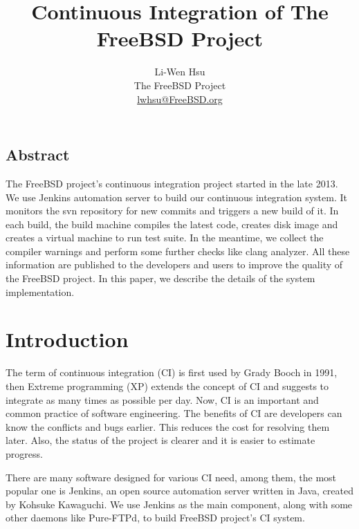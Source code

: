 \documentclass[a4paper,twocolumn,10pt]{article}
\begin{document}
\date{}

\title{\Large \bf Continuous Integration of The FreeBSD Project}

\author{
{\rm Li-Wen Hsu}\\
{\rm The FreeBSD Project}\\
{\rm \href{mailto:lwhsu@FreeBSD.org}{lwhsu@FreeBSD.org}}
}

\maketitle

\thispagestyle{empty}

\subsection*{Abstract}
The FreeBSD project's continuous integration project started in the late 2013.
We use Jenkins automation server to build our continuous integration system.
It monitors the svn repository for new commits and triggers a new build of it.
In each build, the build machine compiles the latest code, creates disk image
and creates a virtual machine to run test suite. In the meantime, we collect
the compiler warnings and perform some further checks like clang analyzer. All
these information are published to the developers and users to improve the
quality of the FreeBSD project. In this paper, we describe the details of the
system implementation.

\section{Introduction}

The term of continuous integration (CI) is first used by Grady Booch in 1991,
then Extreme programming (XP) extends the concept of CI and suggests to
integrate as many times as possible per day. Now, CI is an important and common
practice of software engineering. The benefits of CI are developers can know
the conflicts and bugs earlier. This reduces the cost for resolving them later.
Also, the status of the project is clearer and it is easier to estimate
progress.

There are many software designed for various CI need, among them, the most
popular one is Jenkins, an open source automation server written in Java,
created by Kohsuke Kawaguchi. We use Jenkins as the main component, along with
some other daemons like Pure-FTPd, to build FreeBSD project's CI system.
\end{document}
